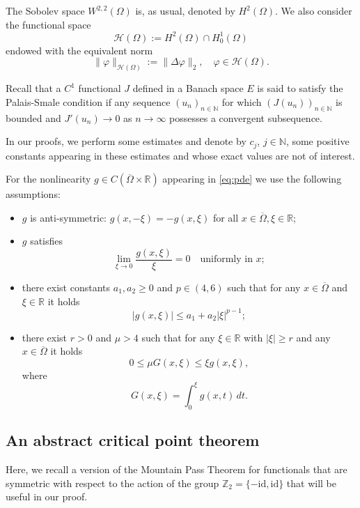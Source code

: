 \documentclass[reqno]{amsart}
\begin{document}
The Sobolev space $W^{2, 2}(\Omega)$ is, as usual, denoted by $H^2(\Omega)$. 
We also consider the functional space
\[
 \mathcal{H}(\Omega) := H^2(\Omega) \cap H_0^1(\Omega)
\]
endowed with the equivalent norm
\[
 \|\varphi\|_{\mathcal{H}(\Omega)} := \|\Delta \varphi\|_2, \quad \varphi \in \mathcal{H}(\Omega).
\]

Recall that a $C^1$ functional $J$ defined in a Banach space $E$ is said to satisfy the 
Palais-Smale condition if any sequence $(u_n)_{n \in \mathbb N}$ for which 
$(J(u_n))_{n \in \mathbb N}$ is bounded and $J'(u_n) \to 0$ as $n \to \infty$ possesses 
a convergent subsequence.

In our proofs, we perform some estimates and denote by $c_j$, $j \in \mathbb N$, some 
positive constants appearing in these estimates and whose exact values are not of 
interest.

For the nonlinearity $g \in C(\overline \Omega \times \mathbb R)$ appearing in 
\eqref{eq:pde} we use the following assumptions:
\begin{itemize}
\item[(A1)] %
$g$ is anti-symmetric: $g(x, - \xi) = - g(x, \xi)$ for all $x \in \overline \Omega, \xi \in \mathbb R$;

\item[(A2)] %
 $g$ satisfies
\[
 \lim_{\xi \to 0} \frac{g(x, \xi)}{\xi} = 0 \quad \text{uniformly in } x;
\]

\item[(A3)] %
there exist constants $a_1, a_2 \geq 0$ and $p \in (4, 6)$ such that for any $x \in \overline \Omega$ and $\xi \in \mathbb R$ it holds
\[
 |g(x, \xi)| \leq a_1 + a_2 |\xi|^{p - 1};
\]

\item[(A4)] %
there exist $r > 0$ and $\mu > 4$ such that for any $\xi \in \mathbb R$ with $|\xi| \geq r$ and any $x \in \overline \Omega$ it holds
 \[
 0 \leq \mu G(x, \xi) \leq \xi g(x, \xi),
 \]
where
 \[
 G(x, \xi) = \int_0^\xi g(x, t) \,dt.
 \]
\end{itemize}

\subsection{An abstract critical point theorem}

Here, we recall a version of the Mountain Pass Theorem for functionals that 
are symmetric with respect to the action of the group 
$\mathbb Z_2 = \{- \text{id}, \text{id}\}$ that will be useful in our proof.
\end{document}
